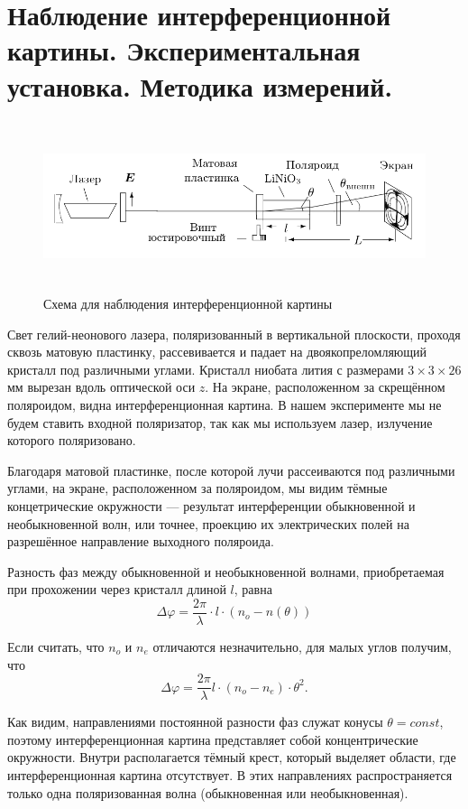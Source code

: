 \documentclass[12pt]{article}
\begin{document}
\section*{Наблюдение интерференционной картины. Экспериментальная установка. Методика измерений.}	
\begin{figure}[h!]
	\centering
	\includegraphics[width = 12cm, height = 5cm]{image2.png}
	\caption{Схема для наблюдения интерференционной картины}
	\label{shm1}	
\end{figure}
\par
	Свет гелий-неонового лазера, поляризованный в вертикальной плоскости, проходя сквозь матовую пластинку, рассевивается и падает на двоякопреломляющий кристалл под различными углами. Кристалл ниобата лития с размерами $3 \times 3 \times 26$ мм вырезан вдоль оптической оси $z$. На экране, расположенном за скрещённом поляроидом, видна интерференционная картина. В нашем эксперименте мы не будем ставить входной поляризатор, так как мы используем лазер, излучение которого поляризовано.
\par
	Благодаря матовой пластинке, после которой лучи рассеиваются под различными углами, на экране, расположенном за поляроидом, мы видим тёмные концетрические окружности --- результат интерференции обыкновенной и необыкновенной волн, или точнее, проекцию их электрических полей на разрешённое направление выходного поляроида.
\par
	Разность фаз между обыкновенной и необыкновенной волнами, приобретаемая при прохожении через кристалл длиной $l$, равна
\[
	\Delta \varphi = \frac{2 \pi}{\lambda} \cdot l \cdot \left( n_o - n(\theta) \right) 
\]
\par
	Если считать, что $n_o$ и $n_e$ отличаются незначительно, для малых углов получим, что
\[
	\Delta \varphi = \frac{2 \pi}{\lambda} l \cdot \left(n_o - n_e \right) \cdot \theta^2.
\]
\par
	Как видим, направлениями постоянной разности фаз служат конусы $\theta = const$, поэтому интерференционная картина представляет собой концентрические окружности. Внутри располагается тёмный крест, который выделяет области, где интерференционная картина отсутствует. В этих направлениях распространяется только одна поляризованная волна (обыкновенная или необыкновенная).
\end{document}

